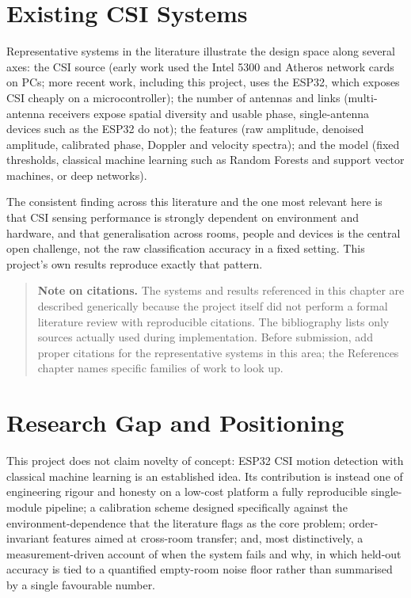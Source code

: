 \documentclass[11pt,a4paper,oneside]{report}
\begin{document}
\section{Existing CSI Systems}

Representative systems in the literature illustrate the design space along
several axes: the CSI source (early work used the Intel 5300 and Atheros
network cards on PCs; more recent work, including this project, uses the ESP32,
which exposes CSI cheaply on a microcontroller); the number of antennas and
links (multi-antenna receivers expose spatial diversity and usable phase,
single-antenna devices such as the ESP32 do not); the features (raw amplitude,
denoised amplitude, calibrated phase, Doppler and velocity spectra); and the
model (fixed thresholds, classical machine learning such as Random Forests and
support vector machines, or deep networks).

The consistent finding across this literature and the one most relevant
here is that CSI sensing performance is strongly dependent on environment
and hardware, and that generalisation across rooms, people and devices is the
central open challenge, not the raw classification accuracy in a fixed setting.
This project's own results reproduce exactly that pattern.

\begin{quote}\small
\textbf{Note on citations.} The systems and results referenced in this chapter
are described generically because the project itself did not perform a formal
literature review with reproducible citations. The bibliography lists only
sources actually used during implementation. Before submission, add proper
citations for the representative systems in this area; the References chapter
names specific families of work to look up.
\end{quote}

\section{Research Gap and Positioning}

This project does not claim novelty of concept: ESP32 CSI motion detection with
classical machine learning is an established idea. Its contribution is instead
one of engineering rigour and honesty on a low-cost platform  a fully
reproducible single-module pipeline; a calibration scheme designed specifically
against the environment-dependence that the literature flags as the core
problem; order-invariant features aimed at cross-room transfer; and, most
distinctively, a measurement-driven account of when the system fails and why,
in which held-out accuracy is tied to a quantified empty-room noise floor
rather than summarised by a single favourable number.
\end{document}
